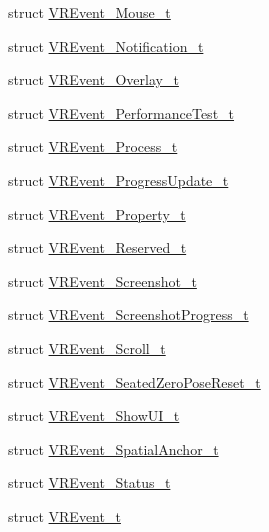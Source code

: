 \begin{DoxyCompactItemize}
\item 
struct \mbox{\hyperlink{struct_valve_1_1_v_r_1_1_v_r_event___mouse__t}{V\+R\+Event\+\_\+\+Mouse\+\_\+t}}
\item 
struct \mbox{\hyperlink{struct_valve_1_1_v_r_1_1_v_r_event___notification__t}{V\+R\+Event\+\_\+\+Notification\+\_\+t}}
\item 
struct \mbox{\hyperlink{struct_valve_1_1_v_r_1_1_v_r_event___overlay__t}{V\+R\+Event\+\_\+\+Overlay\+\_\+t}}
\item 
struct \mbox{\hyperlink{struct_valve_1_1_v_r_1_1_v_r_event___performance_test__t}{V\+R\+Event\+\_\+\+Performance\+Test\+\_\+t}}
\item 
struct \mbox{\hyperlink{struct_valve_1_1_v_r_1_1_v_r_event___process__t}{V\+R\+Event\+\_\+\+Process\+\_\+t}}
\item 
struct \mbox{\hyperlink{struct_valve_1_1_v_r_1_1_v_r_event___progress_update__t}{V\+R\+Event\+\_\+\+Progress\+Update\+\_\+t}}
\item 
struct \mbox{\hyperlink{struct_valve_1_1_v_r_1_1_v_r_event___property__t}{V\+R\+Event\+\_\+\+Property\+\_\+t}}
\item 
struct \mbox{\hyperlink{struct_valve_1_1_v_r_1_1_v_r_event___reserved__t}{V\+R\+Event\+\_\+\+Reserved\+\_\+t}}
\item 
struct \mbox{\hyperlink{struct_valve_1_1_v_r_1_1_v_r_event___screenshot__t}{V\+R\+Event\+\_\+\+Screenshot\+\_\+t}}
\item 
struct \mbox{\hyperlink{struct_valve_1_1_v_r_1_1_v_r_event___screenshot_progress__t}{V\+R\+Event\+\_\+\+Screenshot\+Progress\+\_\+t}}
\item 
struct \mbox{\hyperlink{struct_valve_1_1_v_r_1_1_v_r_event___scroll__t}{V\+R\+Event\+\_\+\+Scroll\+\_\+t}}
\item 
struct \mbox{\hyperlink{struct_valve_1_1_v_r_1_1_v_r_event___seated_zero_pose_reset__t}{V\+R\+Event\+\_\+\+Seated\+Zero\+Pose\+Reset\+\_\+t}}
\item 
struct \mbox{\hyperlink{struct_valve_1_1_v_r_1_1_v_r_event___show_u_i__t}{V\+R\+Event\+\_\+\+Show\+U\+I\+\_\+t}}
\item 
struct \mbox{\hyperlink{struct_valve_1_1_v_r_1_1_v_r_event___spatial_anchor__t}{V\+R\+Event\+\_\+\+Spatial\+Anchor\+\_\+t}}
\item 
struct \mbox{\hyperlink{struct_valve_1_1_v_r_1_1_v_r_event___status__t}{V\+R\+Event\+\_\+\+Status\+\_\+t}}
\item 
struct \mbox{\hyperlink{struct_valve_1_1_v_r_1_1_v_r_event__t}{V\+R\+Event\+\_\+t}}
\item 

\end{DoxyCompactItemize}
